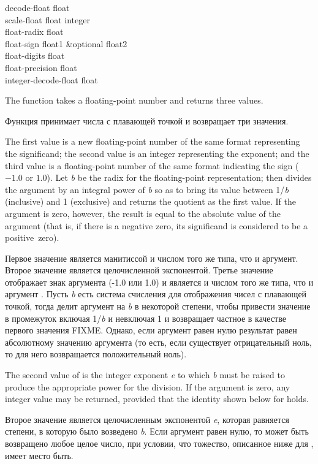 \begin{defun}[Function]
decode-float float \\
scale-float float integer \\
float-radix float \\
float-sign float1 &optional float2 \\
float-digits float \\
float-precision float \\
integer-decode-float float

The function  takes a floating-point number
and returns three values.

Функция  принимает числа с плавающей точкой и возвращает три
значения.

The first value is a new floating-point number of the same format
representing the significand; the second value is an integer
representing the exponent; and the third value is a floating-point
number of the same format indicating the sign ($-1.0$ or $1.0$).
Let \emph{b} be the radix for the floating-point representation;
then  divides the argument by an integral power of \emph{b}
so as to bring its value between 1/\emph{b} (inclusive) and 1 (exclusive)
and returns the quotient as the first value.
If the argument is zero, however, the result
is equal to the absolute value of the argument (that is, if there is a negative
zero, its significand is considered to be a positive~zero).

Первое значение является манитиссой и числом того же типа, что и
аргумент. Второе значение является целочисленной экспонентой.
Третье значение отображает знак аргумента (-1.0 или 1.0) и является и числом
того же типа, что и аргумент .
Пусть \emph{b} есть система счисления для отображения чисел с плавающей точкой,
тогда  делит аргумент на \emph{b} в некоторой степени, чтобы
привести значение в промежуток включая 1/\emph{b} и невключая 1 и возвращает
частное в качестве первого значения FIXME. Однако, если аргумент равен нулю
результат равен абсолютному значению аргумента (то есть, если существует
отрицательный ноль, то для него возвращается положительный ноль).

The second value of  is
the integer exponent \emph{e} to which \emph{b} must be raised
to produce the appropriate power for the division.
If the argument is zero, any integer value may be returned, provided
that the identity shown below for  holds.

Второе значение  является целочисленным экспонентой \emph{e},
которая равняется степени, в которую было возведено \emph{b}.
Если аргумент равен нулю, то может быть возвращено любое целое число, при
условии, что тожество, описанное ниже для , имеет место быть.


\end{defun}
